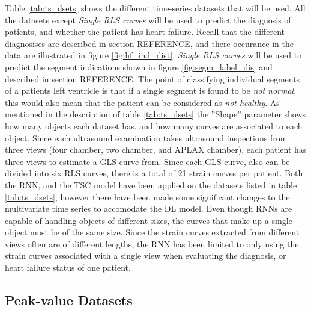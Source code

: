 Table \ref{tab:ts_dsets} shows the different time-series datasets that will be used. 
All the datasets except \textit{Single RLS curves} will be used to predict the diagnosis of patients, and whether the patient has heart failure.
Recall that the different diagnosises are described in section REFERENCE, and there occurance in the data are illustrated in figure \ref{fig:hf_ind_dist}.
\textit{Single RLS curves} will be used to predict the segment indications shown in figure \ref{fig:segm_label_dis} and described in section REFERENCE. 
The point of classifying individual segments of a patients left ventricle is that if a single segment is found to be \textit{not normal}, 
this would also mean that the patient can be considered as \textit{not healthy}.
As mentioned in the description of table \ref{tab:ts_dsets} the ''Shape'' parameter shows how many objects each dataset has, and how many curves are associated to each object. 
Since each ultrasound examination takes ultrasound inspections from three views (four chamber, two chamber, and APLAX chamber), each patient has three views to estimate a GLS curve from. 
Since each GLS curve, also can be divided into six RLS curves, there is a total of 21 strain curves per patient. 
Both the RNN, and the TSC model have been applied on the datasets listed in table \ref{tab:ts_dsets}, 
however there have been made some significant changes to the multivariate time series to accomodate the DL model.
Even though RNNs are capable of handling objects of different sizes, the curves that make up a single object must be of the same size.
Since the strain curves extracted from different views often are of different lengths, the RNN has been limited to only using the strain curves associated with a single view
when evaluating the diagnosis, or heart failure status of one patient.

\subsection{Peak-value Datasets}

